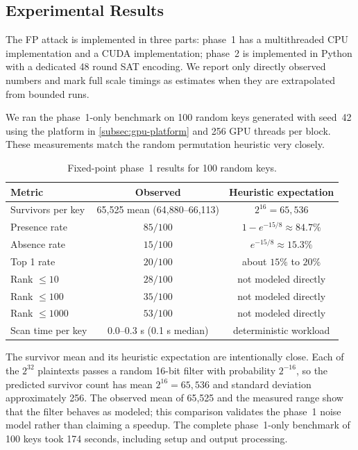 \documentclass[version=preprint]{iacrcc}
\begin{document}
\subsection{Experimental Results}\label{sec:fp-experimental}

The FP attack is implemented in three parts:
phase~1 has a multithreaded CPU implementation and a CUDA implementation;
phase~2 is implemented in Python with a dedicated 48 round SAT encoding.
We report only directly observed numbers and mark full scale timings as estimates when they are extrapolated from bounded runs.

We ran the phase~1-only benchmark on 100 random keys generated with seed~42 using the platform in \autoref{subsec:gpu-platform} and 256 GPU threads per block.
These measurements match the random permutation heuristic very closely.

\begin{table}[htbp]
  \centering
  \caption{Fixed-point phase~1 results for 100 random keys.}
  \label{tab:fixedpoint-phase1}
  \begin{tabular}{lcc}
    \toprule
    Metric & Observed & Heuristic expectation \\
    \midrule
    Survivors per key & 65,525 mean (64,880--66,113) & $2^{16}=65,536$ \\
    Presence rate & $85/100$ & $1-e^{-15/8}\approx 84.7\%$ \\
    Absence rate & $15/100$ & $e^{-15/8}\approx 15.3\%$ \\
    Top 1 rate & $20/100$ & about $15\%$ to $20\%$ \\
    Rank $\leq 10$ & $28/100$ & not modeled directly \\
    Rank $\leq 100$ & $35/100$ & not modeled directly \\
    Rank $\leq 1000$ & $53/100$ & not modeled directly \\
    Scan time per key & $0.0$--$0.3$ s (0.1 s median) & deterministic workload \\
    \bottomrule
  \end{tabular}
\end{table}

The survivor mean and its heuristic expectation are intentionally close.
Each of the $2^{32}$ plaintexts passes a random 16-bit filter with probability $2^{-16}$, so the predicted survivor count has mean $2^{16}=65{,}536$ and standard deviation approximately 256.
The observed mean of 65,525 and the measured range show that the filter behaves as modeled; this comparison validates the phase~1 noise model rather than claiming a speedup.
The complete phase~1-only benchmark of 100 keys took 174 seconds, including setup and output processing.
\end{document}
